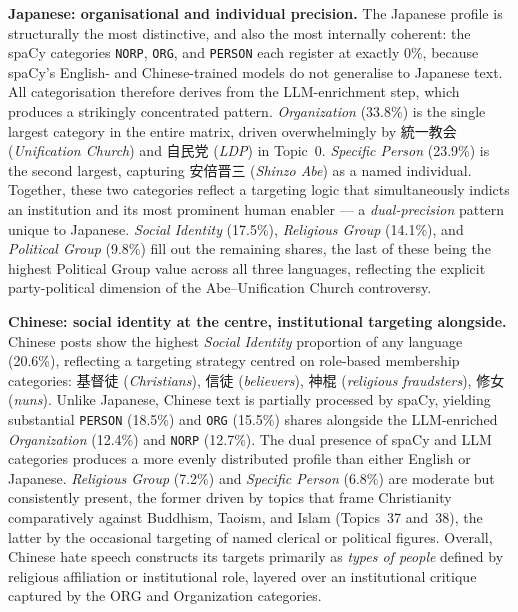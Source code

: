 \documentclass[../CLthesis.tex]{subfiles}
\begin{document}
\textbf{Japanese: organisational and individual precision.}
The Japanese profile is structurally the most distinctive, and also the most internally coherent: the spaCy categories \texttt{NORP}, \texttt{ORG}, and \texttt{PERSON} each register at exactly 0\%, because spaCy's English- and Chinese-trained models do not generalise to Japanese text. All categorisation therefore derives from the LLM-enrichment step, which produces a strikingly concentrated pattern. \textit{Organization} (33.8\%) is the single largest category in the entire matrix, driven overwhelmingly by 統一教会 (\textit{Unification Church}) and 自民党 (\textit{LDP}) in Topic~0. \textit{Specific Person} (23.9\%) is the second largest, capturing 安倍晋三 (\textit{Shinzo Abe}) as a named individual. Together, these two categories reflect a targeting logic that simultaneously indicts an institution and its most prominent human enabler --- a \textit{dual-precision} pattern unique to Japanese. \textit{Social Identity} (17.5\%), \textit{Religious Group} (14.1\%), and \textit{Political Group} (9.8\%) fill out the remaining shares, the last of these being the highest Political Group value across all three languages, reflecting the explicit party-political dimension of the Abe--Unification Church controversy.

\textbf{Chinese: social identity at the centre, institutional targeting alongside.}
Chinese posts show the highest \textit{Social Identity} proportion of any language (20.6\%), reflecting a targeting strategy centred on role-based membership categories: 基督徒 (\textit{Christians}), 信徒 (\textit{believers}), 神棍 (\textit{religious fraudsters}), 修女 (\textit{nuns}). Unlike Japanese, Chinese text is partially processed by spaCy, yielding substantial \texttt{PERSON} (18.5\%) and \texttt{ORG} (15.5\%) shares alongside the LLM-enriched \textit{Organization} (12.4\%) and \texttt{NORP} (12.7\%). The dual presence of spaCy and LLM categories produces a more evenly distributed profile than either English or Japanese. \textit{Religious Group} (7.2\%) and \textit{Specific Person} (6.8\%) are moderate but consistently present, the former driven by topics that frame Christianity comparatively against Buddhism, Taoism, and Islam (Topics~37 and~38), the latter by the occasional targeting of named clerical or political figures. Overall, Chinese hate speech constructs its targets primarily as \textit{types of people} defined by religious affiliation or institutional role, layered over an institutional critique captured by the ORG and Organization categories.
\end{document}
